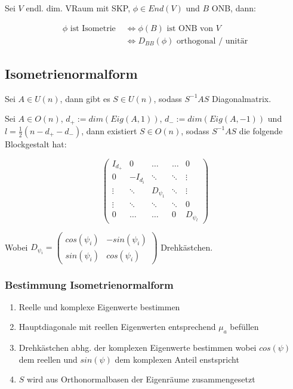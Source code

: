 Sei $V$ endl. dim. VRaum mit SKP, $\phi \in End(V)$ und $B$ ONB, dann:

\vspace*{-6mm}
\begin{align*}
	\phi \text{ ist Isometrie } &\Leftrightarrow \phi(B) \text{ ist ONB von } V \\
							    &\Leftrightarrow D_{BB}(\phi) \text{ orthogonal / unitär}
\end{align*}

\subsection*{Isometrienormalform}

Sei $A \in U(n)$, dann gibt es $S \in U(n)$, sodass $S^{-1} A S$ Diagonalmatrix.

Sei $A \in O(n)$, $d_+ := dim(Eig(A,1))$, $d_- := dim(Eig(A, -1))$ und $l = \frac{1}{2}(n - d_+ - d_-)$, dann existiert $S \in O(n)$, sodass $S^{-1} A S$ die folgende Blockgestalt hat:

\vspace{-4mm}
\[ \begin{pmatrix}
I_{d_+} & 0        & \hdots     & \hdots & 0      \\
0       & -I_{d_i} & \ddots     & \ddots & \vdots \\
\vdots  & \ddots   & D_{\psi_1} & \ddots & \vdots \\
\vdots  & \ddots   & \ddots     & \ddots & 0      \\
0       & \hdots   & \hdots     & 0      & D_{\psi_l}
\end{pmatrix} \]

Wobei $D_{\psi_i} = \begin{pmatrix} cos(\psi_i) & -sin(\psi_i) \\ sin(\psi_i) & cos(\psi_i) \end{pmatrix}$ Drehkästchen.

\subsubsection*{Bestimmung Isometrienormalform}

\begin{enumerate}[leftmargin=4mm]
	\item Reelle und komplexe Eigenwerte bestimmen
	\item Hauptdiagonale mit reellen Eigenwerten entsprechend $\mu_a$ befüllen
	\item Drehkästchen abhg. der komplexen Eigenwerte bestimmen wobei $cos(\psi)$ dem reellen und $sin(\psi)$ dem komplexen Anteil enstspricht
	\item $S$ wird aus Orthonormalbasen der Eigenräume zusammengesetzt
\end{enumerate}

